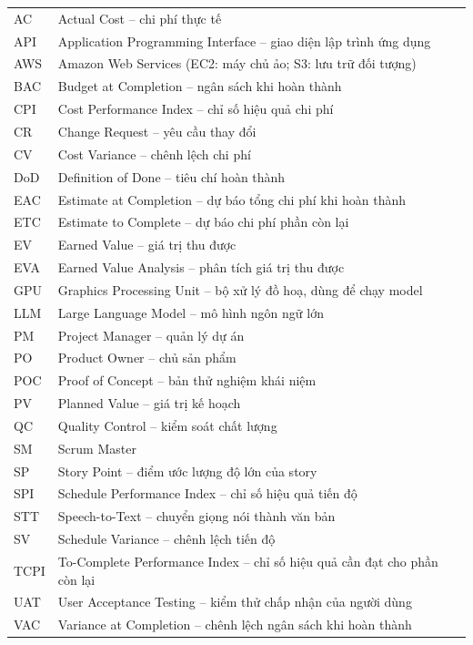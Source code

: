 \documentclass[12pt,a4paper]{report}
\begin{document}
\begin{center}
  \begin{tabular}{@{}P{2.2cm}P{13.2cm}@{}}
    \toprule
     &  \\
    \midrule
    AC     & Actual Cost -- chi phí thực tế \\
    API    & Application Programming Interface -- giao diện lập trình ứng dụng \\
    AWS    & Amazon Web Services (EC2: máy chủ ảo; S3: lưu trữ đối tượng) \\
    BAC    & Budget at Completion -- ngân sách khi hoàn thành \\
    CPI    & Cost Performance Index -- chỉ số hiệu quả chi phí \\
    CR     & Change Request -- yêu cầu thay đổi \\
    CV     & Cost Variance -- chênh lệch chi phí \\
    DoD    & Definition of Done -- tiêu chí hoàn thành \\
    EAC    & Estimate at Completion -- dự báo tổng chi phí khi hoàn thành \\
    ETC    & Estimate to Complete -- dự báo chi phí phần còn lại \\
    EV     & Earned Value -- giá trị thu được \\
    EVA    & Earned Value Analysis -- phân tích giá trị thu được \\
    GPU    & Graphics Processing Unit -- bộ xử lý đồ hoạ, dùng để chạy model \\
    LLM    & Large Language Model -- mô hình ngôn ngữ lớn \\
    PM     & Project Manager -- quản lý dự án \\
    PO     & Product Owner -- chủ sản phẩm \\
    POC    & Proof of Concept -- bản thử nghiệm khái niệm \\
    PV     & Planned Value -- giá trị kế hoạch \\
    QC     & Quality Control -- kiểm soát chất lượng \\
    SM     & Scrum Master \\
    SP     & Story Point -- điểm ước lượng độ lớn của story \\
    SPI    & Schedule Performance Index -- chỉ số hiệu quả tiến độ \\
    STT    & Speech-to-Text -- chuyển giọng nói thành văn bản \\
    SV     & Schedule Variance -- chênh lệch tiến độ \\
    TCPI   & To-Complete Performance Index -- chỉ số hiệu quả cần đạt cho phần còn lại \\
    UAT    & User Acceptance Testing -- kiểm thử chấp nhận của người dùng \\
    VAC    & Variance at Completion -- chênh lệch ngân sách khi hoàn thành \\
    \bottomrule
  \end{tabular}
\end{center}
\end{document}

